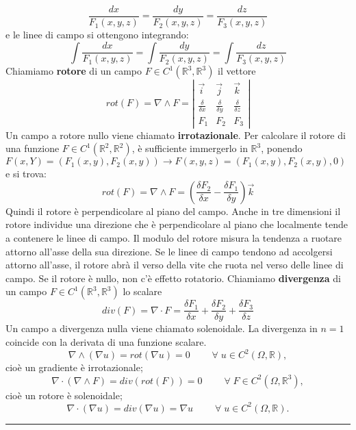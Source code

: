 \[
    \frac{dx}{F_1(x,y,z)} = 
    \frac{dy}{F_2(x,y,z)} = 
    \frac{dz}{F_3(x,y,z)}
\]
e le linee di campo si ottengono integrando:
\[
    \int \frac{dx}{F_1(x,y,z)} = 
    \int \frac{dy}{F_2(x,y,z)} = 
    \int \frac{dz}{F_3(x,y,z)}
\]
\newline
Chiamiamo \textbf{rotore} di un campo $F \in C^1(\mathbb{R}^3, \mathbb{R}^3)$ il vettore
\[
    rot(F) = \nabla \land F = \left|\begin{matrix}
        \vec{i} & \vec{j} & \vec{k} \\
        \frac{\delta }{\delta x} & \frac{\delta }{\delta y} & \frac{\delta }{\delta z}\\
        F_1 & F_2 & F_3
    \end{matrix} \right|
\]
Un campo a rotore nullo viene chiamato \textbf{irrotazionale}.\newline
Per calcolare il rotore di una funzione $F \in C^1(\mathbb{R}^2, \mathbb{R}^2)$, è sufficiente immergerlo in $\mathbb{R}^3$, ponendo $F(x,Y) = (F_1(x,y), F_2(x,y)) \rightarrow  F(x,y,z) = (F_1(x,y), F_2(x,y), 0)$ e si trova:
\[
    rot(F) = \nabla\land F = \left(\frac{\delta F_2}{\delta x} - \frac{\delta F_1}{\delta y}\right)\vec{k}
\]
Quindi il rotore è perpendicolare al piano del campo.\newline
Anche in tre dimensioni il rotore individue una direzione che è perpendicolare al piano che localmente tende a contenere le linee di campo.\newline
Il modulo del rotore misura la tendenza a ruotare attorno all'asse della sua direzione. Se le linee di campo tendono ad accolgersi attorno all'asse, il rotore abrà il verso della vite che ruota nel verso delle linee di campo. Se il rotore è nullo, non c'è effetto rotatorio.\newline
\newline
Chiamiamo \textbf{divergenza} di un campo $F \in C^1(\mathbb{R}^3, \mathbb{R}^3)$ lo scalare
\[
    div(F) = \nabla \cdot F = \frac{\delta F_1}{\delta x} +\frac{\delta F_2}{\delta y} +\frac{\delta F_3}{\delta z}
\]
Un campo a divergenza nulla viene chiamato solenoidale.\newline
La divergenza in $n=1$ coincide con la derivata di una funzione scalare.\newline
\newline
\[
    \nabla \land (\nabla u) = rot(\nabla u) = 0 \quad \quad \;\forall\;u \in C^2(\Omega, \mathbb{R}),
\]
cioè un gradiente è irrotazionale;
\[
    \nabla \cdot  (\nabla \land F) = div(rot(F)) = 0 \quad \quad \;\forall\; F \in C^2(\Omega, \mathbb{R}^3),
\]
cioè un rotore è solenoidale;
\[
    \nabla \cdot (\nabla u) = div(\nabla u) = \nabla u \quad \quad \;\forall\;u \in C^2(\Omega, \mathbb{R}).
\]
\rule{\textwidth}{2pt}
